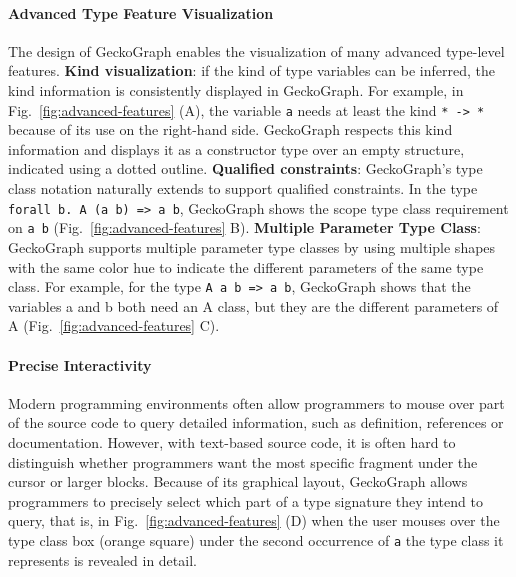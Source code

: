 \paragraph{Advanced Type Feature Visualization}
The design of GeckoGraph enables the visualization of many advanced type-level features. \textbf{Kind visualization}: if the kind of type variables can be inferred, the kind information is consistently displayed in GeckoGraph. For example, in Fig.~\ref{fig:advanced-features} (A), the variable \texttt{a} needs at least the kind \texttt{* -> *} because of its use on the right-hand side. GeckoGraph respects this kind information and displays it as a constructor type over an empty structure, indicated using a dotted outline.  \textbf{Qualified constraints}: GeckoGraph's type class notation naturally extends to support qualified constraints. In the type \texttt{forall b. A (a b) => a b}, GeckoGraph shows the scope type class requirement on \texttt{a b} (Fig.~\ref{fig:advanced-features} B).
\textbf{Multiple Parameter Type Class}:  GeckoGraph supports multiple parameter type classes by using multiple shapes with the same color hue to indicate the different parameters of the same type class.  For example, for the type \texttt{A a b => a b},  GeckoGraph shows that the variables a and b both need an A class, but they are the different parameters of A (Fig.~\ref{fig:advanced-features} C).

\paragraph{Precise Interactivity}
Modern programming environments often allow programmers to mouse over part of the source code to query detailed information, such as definition, references or documentation. However, with text-based source code, it is often hard to distinguish whether programmers want the most specific fragment under the cursor or larger blocks. Because of its graphical layout, GeckoGraph allows programmers to precisely select which part of a type signature they intend to query, that is, in Fig.~\ref{fig:advanced-features} (D) when the user mouses over the type class box (orange square) under the second occurrence of \texttt{a} the type class it represents is revealed in detail. 

